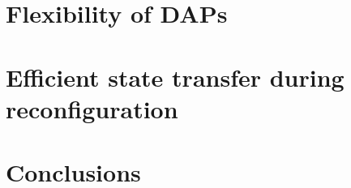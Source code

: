 \documentclass[acmsmall]{acmart}
\begin{document}
\section{Flexibility of DAPs}\label{sec:dap:flexible}


\section{Efficient state transfer during reconfiguration}
\label{sec:transfer}


\section{Conclusions}

\label{sec:conclusions}



%
%


%
%
\end{document}
